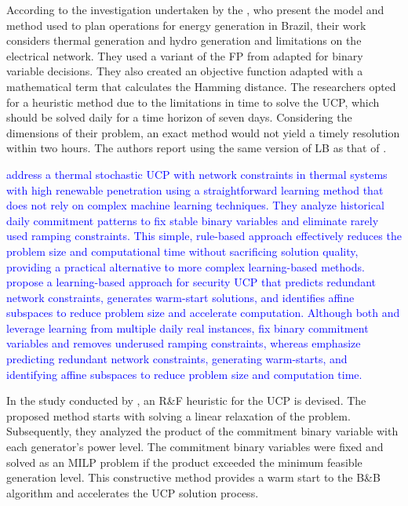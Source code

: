 According to the investigation undertaken by the \citet{Santos2020}, who present the model and method used to plan operations for energy generation in Brazil, their work considers thermal generation and hydro generation and limitations on the electrical network. They used a variant of the FP from \citet{Fischetti2005} adapted for binary variable decisions. They also created an objective function adapted with a mathematical term that calculates the Hamming distance. The researchers opted for a heuristic method due to the limitations in time to solve the UCP, which should be solved daily for a time horizon of seven days. Considering the dimensions of their problem, an exact method would not yield a timely resolution within two hours. The authors report using the same version of LB as that of \citet{Saboia2016}.

\textcolor{blue}{
\citet{Liu2023} address a thermal stochastic UCP with network constraints in thermal systems with high renewable penetration using a straightforward learning method that does not rely on complex machine learning techniques. They analyze historical daily commitment patterns to fix stable binary variables and eliminate rarely used ramping constraints. This simple, rule-based approach effectively reduces the problem size and computational time without sacrificing solution quality, providing a practical alternative to more complex learning-based methods.
\citet{Xavier2021} propose a learning-based approach for  security UCP that predicts redundant network constraints, generates warm-start solutions, and identifies affine subspaces to reduce problem size and accelerate computation.
Although both \citet{Liu2023} and \citet{Xavier2021} leverage learning from multiple daily real instances, \citet{Liu2023} fix binary commitment variables and removes underused ramping constraints, whereas \citet{Xavier2021} emphasize predicting redundant network constraints, generating warm-starts, and identifying affine subspaces to reduce problem size and computation time.
}

In the study conducted by \citet{Harjunkoski2021}, an R\&F heuristic for the UCP is devised. The proposed method starts with solving a linear relaxation of the problem. Subsequently, they analyzed the product of the commitment binary variable with each generator's power level. The commitment binary variables were fixed and solved as an MILP problem if the product exceeded the minimum feasible generation level. This constructive method provides a warm start to the B\&B algorithm and accelerates the UCP solution process.



